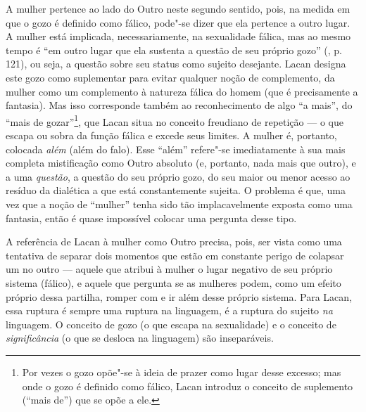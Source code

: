 A mulher pertence ao lado do Outro neste segundo sentido, pois, na
medida em que o gozo é definido como fálico, pode"-se dizer que ela
pertence a outro lugar. A mulher está implicada, necessariamente, na
sexualidade fálica, mas ao mesmo tempo é ``em outro lugar que ela
sustenta a questão de seu próprio gozo'' (, p. 121), ou seja, a
questão sobre seu status como sujeito desejante. Lacan designa este gozo
como suplementar para evitar qualquer noção de complemento, da mulher
como um complemento à natureza fálica do homem (que é precisamente a
fantasia). Mas isso corresponde também ao reconhecimento de algo ``a
mais'', do ``mais de gozar''\footnote{Por vezes o gozo opõe"-se à ideia
  de prazer como lugar desse excesso; mas onde o gozo é definido como
  fálico, Lacan introduz o conceito de suplemento (``mais de'') que se
  opõe a ele.}, que Lacan situa no conceito freudiano de repetição --- o
que escapa ou sobra da função fálica e excede seus limites. A mulher é,
portanto, colocada \emph{além} (além do falo). Esse ``além'' refere"-se
imediatamente à sua mais completa mistificação como Outro absoluto (e,
portanto, nada mais que outro), e a uma \emph{questão}, a questão do seu
próprio gozo, do seu maior ou menor acesso ao resíduo da dialética a que
está constantemente sujeita. O problema é que, uma vez que a noção de
``mulher'' tenha sido tão implacavelmente exposta como uma fantasia,
então é quase impossível colocar uma pergunta desse tipo.

A referência de Lacan à mulher como Outro precisa, pois, ser vista como
uma tentativa de separar dois momentos que estão em constante perigo de
colapsar um no outro --- aquele que atribui à mulher o lugar negativo de
seu próprio sistema (fálico), e aquele que pergunta se as mulheres
podem, como um efeito próprio dessa partilha, romper com e ir além desse
próprio sistema. Para Lacan, essa ruptura é sempre uma ruptura na
linguagem, é a ruptura do sujeito \emph{na} linguagem. O conceito de
gozo (o que escapa na sexualidade) e o conceito de \emph{significância}
(o que se desloca na linguagem) são inseparáveis.

